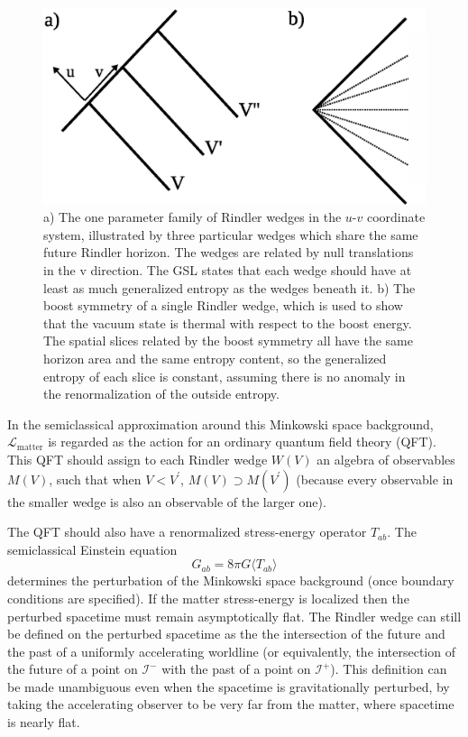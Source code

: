 \documentclass[12pt]{article}
\begin{document}
\begin{figure}[ht]
\centering
\includegraphics[width=.9\textwidth]{wedges.eps}
\caption{\footnotesize a) The one parameter family of Rindler wedges in the $u$-$v$ coordinate system, illustrated by three particular wedges which share the same future Rindler horizon.  The wedges are related by null translations in the v direction.  The GSL states that each wedge should have at least as much generalized entropy as the wedges beneath it.  b) The boost symmetry of a single Rindler wedge, which is used to show that the vacuum state is thermal with respect to the boost energy.  The spatial slices related by the boost symmetry all have the same horizon area and the same entropy content, so the generalized entropy of each slice is constant, assuming there is no anomaly in the renormalization of the outside entropy.} \label{wedges}
\end{figure}

In the semiclassical approximation around this Minkowski space background, $\mathcal{L}_\mathrm{matter}$ is regarded as the action for an ordinary quantum field theory (QFT).   This QFT should assign to each Rindler wedge $W(V)$ an algebra of observables $M(V)$, such that when $V < V^\prime$, $M(V) \supset M(V^\prime)$ (because every observable in the smaller wedge is also an observable of the larger one).  

The QFT should also have a renormalized stress-energy operator $T_{ab}$.  The semiclassical Einstein equation
\begin{equation}\label{semiEin}
G_{ab} = 8\pi G \langle T_{ab} \rangle
\end{equation}
determines the perturbation of the Minkowski space background (once boundary conditions are specified).  If the matter stress-energy is localized then the perturbed spacetime must remain asymptotically flat.  The Rindler wedge can still be defined on the perturbed spacetime as the the intersection of the future and the past of a uniformly accelerating worldline (or equivalently, the intersection of the future of a point on $\mathcal{I}^-$ with the past of a point on $\mathcal{I}^+$).  This definition can be made unambiguous even when the spacetime is gravitationally perturbed, by taking the accelerating observer to be very far from the matter, where spacetime is nearly flat.
\end{document}

